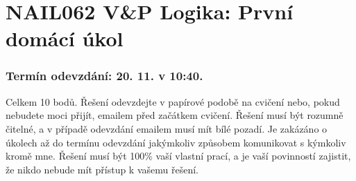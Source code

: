 \documentclass[a4paper,12pt]{article}
\begin{document}
\section*{NAIL062 V\&P Logika: První domácí  úkol}

\subsubsection*{Termín odevzdání: 20. 11. v 10:40.}
Celkem 10 bodů. Řešení odevzdejte v papírové podobě na cvičení nebo, pokud nebudete moci přijít, emailem před začátkem cvičení. Řešení musí být rozumně čitelné, a v případě odevzdání emailem musí mít bílé pozadí. Je zakázáno o úkolech až do termínu odevzdání jakýmkoliv způsobem komunikovat s kýmkoliv kromě mne. Řešení musí být 100\% vaší vlastní prací, a je vaší povinností zajistit, že nikdo nebude mít přístup k vašemu řešení.

\bigskip
\end{document}
